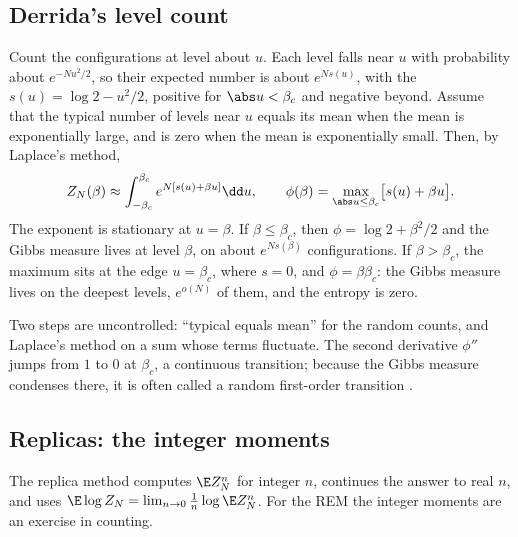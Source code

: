 \begin{refsection}
\subsection{Derrida's level count}\label{sec:rem:count}

\begin{heuristic}
Count the configurations at level about $u$. Each level falls near $u$ with probability about $e^{-Nu^2/2}$, so their expected number is about $e^{Ns(u)}$, with the  $s(u)=\log2-u^2/2$, positive for $\abs u<\beta_c$ and negative beyond. Assume that the typical number of levels near $u$ equals its mean when the mean is exponentially large, and is zero when the mean is exponentially small. Then, by Laplace's method,
\[
Z_N(\beta)\approx\int_{-\beta_c}^{\beta_c}e^{N[s(u)+\beta u]}\dd u,\qquad\phi(\beta)=\max_{\abs u\le\beta_c}\bigl[s(u)+\beta u\bigr].
\]
The exponent is stationary at $u=\beta$. If $\beta\le\beta_c$, then $\phi=\log2+\beta^2/2$ and the Gibbs measure lives at level $\beta$, on about $e^{Ns(\beta)}$ configurations. If $\beta>\beta_c$, the maximum sits at the edge $u=\beta_c$, where $s=0$, and $\phi=\beta\beta_c$: the Gibbs measure lives on the deepest levels, $e^{o(N)}$ of them, and the entropy is zero.
\end{heuristic}

Two steps are uncontrolled: ``typical equals mean'' for the random counts, and Laplace's method on a sum whose terms fluctuate. The second derivative $\phi''$ jumps from $1$ to $0$ at $\beta_c$, a continuous transition; because the Gibbs measure condenses there, it is often called a random first-order transition \parencite[ch.~5]{MezardMontanari2009}.

\subsection{Replicas: the integer moments}\label{sec:rem:replicas}

The replica method computes $\E Z_N^n$ for integer $n$, continues the answer to real $n$, and uses $\E\log Z_N=\lim_{n\to0}\frac1n\log\E Z_N^n$. For the REM the integer moments are an exercise in counting.


\end{refsection}
